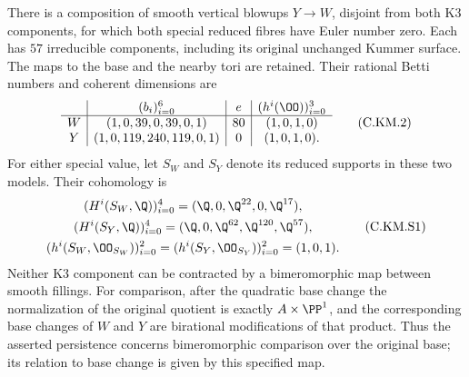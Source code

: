 \begin{proposition}
There is a composition of smooth vertical blowups $Y\to W$,
disjoint from both K3 components, for which both special reduced
fibres have Euler number zero. Each has $57$ irreducible
components, including its original unchanged Kummer surface.
The maps to the base and the nearby tori are retained. Their
rational Betti numbers and coherent dimensions are
\[
 \begin{array}{c|c|c|c}
 & (b_i)_{i=0}^6 & e & (h^i(\OO))_{i=0}^3\\ \hline
 W&(1,0,39,0,39,0,1)&80&(1,0,1,0)\\
 Y&(1,0,119,240,119,0,1)&0&(1,0,1,0).
 \end{array}                                             \tag{C.KM.2}\label{cdp:eq:C.KM.2}
\]
For either special value, let $S_W$ and $S_Y$ denote its
reduced supports in these two models. Their cohomology is
\[
 \begin{gathered}
 (H^i(S_W,\Q))_{i=0}^4=(\Q,0,\Q^{22},0,\Q^{17}),\\
 (H^i(S_Y,\Q))_{i=0}^4=(\Q,0,\Q^{62},\Q^{120},\Q^{57}),\\
 (h^i(S_W,\OO_{S_W}))_{i=0}^2
   =(h^i(S_Y,\OO_{S_Y}))_{i=0}^2=(1,0,1).
 \end{gathered}                                          \tag{C.KM.S1}\label{cdp:eq:C.KM.S1}
\]
Neither K3 component can be contracted by a bimeromorphic map
between smooth fillings. For comparison, after the quadratic
base change the normalization of the original quotient is
exactly $A\times\PP^1$, and the corresponding base changes
of $W$ and $Y$ are birational modifications of that product.
Thus the asserted persistence concerns bimeromorphic comparison
over the original base; its relation to base change is given
by this specified map.
\end{proposition}

